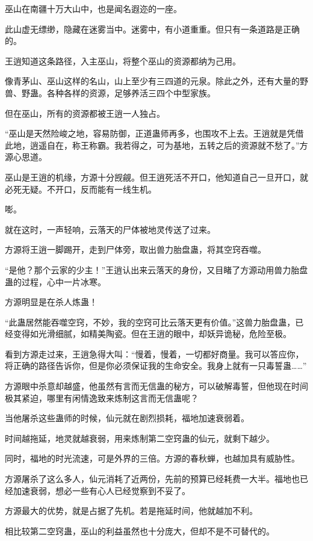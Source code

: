 \begin{this_body}
巫山在南疆十万大山中，也是闻名遐迩的一座。

此山虚无缥缈，隐藏在迷雾当中。迷雾中，有小道重重。但只有一条道路是正确的。

王逍知道这条路径，入主巫山，将整个巫山的资源都纳为己用。

像青茅山、巫山这样的名山，山上至少有三四道的元泉。除此之外，还有大量的野兽、野蛊。各种各样的资源，足够养活三四个中型家族。

但在巫山，所有的资源都被王逍一人独占。

“巫山是天然险峻之地，容易防御，正道蛊师再多，也围攻不上去。王逍就是凭借此地，逍遥自在，称王称霸。我若得之，可为基地，五转之后的资源就不愁了。”方源心思道。

巫山是王逍的机缘，方源十分觊觎。但王逍死活不开口，他知道自己一旦开口，就必死无疑。不开口，反而能有一线生机。

嘭。

就在这时，一声轻响，云落天的尸体被地灵传送了过来。

方源将王逍一脚踢开，走到尸体旁，取出兽力胎盘蛊，将其空窍吞噬。

“是他？那个云家的少主！”王逍认出来云落天的身份，又目睹了方源动用兽力胎盘蛊的过程，心中一片冰寒。

方源明显是在杀人炼蛊！

“此蛊居然能吞噬空窍，不妙，我的空窍可比云落天更有价值。”这兽力胎盘蛊，已经变得如光滑细腻，如精美陶瓷。但在王逍的眼中，却妖异诡秘，危险至极。

看到方源走过来，王逍急得大叫：“慢着，慢着，一切都好商量。我可以答应你，将正确的路径告诉你，但是你必须保证我的生命安全。我身上就有一只毒誓蛊……”

方源眼中杀意却越盛，他虽然有言而无信蛊的秘方，可以破解毒誓，但他现在时间极其紧迫，哪里有闲情逸致来炼制这言而无信蛊呢？

当他屠杀这些蛊师的时候，仙元就在剧烈损耗，福地加速衰弱着。

时间越拖延，地灵就越衰弱，用来炼制第二空窍蛊的仙元，就剩下越少。

同时，福地的时光流速，可是外界的三倍。方源的春秋蝉，也越加具有威胁性。

方源屠杀了这么多人，仙元消耗了近两份，先前的预算已经耗费一大半。福地也已经加速衰弱，想必一些有心人已经觉察到不妥了。

方源最大的优势，就是占据了先机。若是拖延时间，他就越加不利。

相比较第二空窍蛊，巫山的利益虽然也十分庞大，但却不是不可替代的。


\end{this_body}
